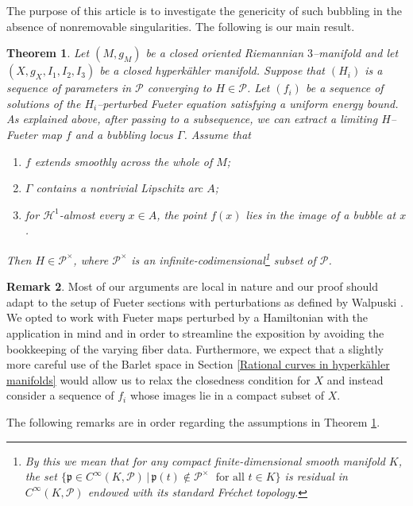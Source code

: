 \documentclass[11pt,a4paper]{article}
\newtheorem{theorem}{Theorem}[section]
\theoremstyle{definition}
\newtheorem{rem}[theorem]{Remark}
\newcommand{\fp}{\mathfrak{p}}
\newcommand{\cH}{\mathcal{H}}
\newcommand{\cP}{\mathcal{P}}
\begin{document}
The purpose of this article is to investigate the genericity of such bubbling in the absence of nonremovable singularities. The following is our main result. 
\begin{theorem}\label{main theorem}
  Let $(M, g_M)$ be a closed oriented Riemannian $3$--manifold and let $(X, g_X, I_1, I_2, I_3)$ be a closed hyperk\"ahler manifold. Suppose that $(H_i)$ is a sequence of parameters in $\cP$ converging to $H \in \cP$. Let $(f_i)$ be a sequence of solutions of the $H_i$--perturbed Fueter equation satisfying a uniform energy bound. As explained above, after passing to a subsequence, we can extract a limiting $H$--Fueter map $f$ and a bubbling locus $\Gamma$. Assume that
  \begin{enumerate}[
  label=\textnormal{(\roman*)},
  topsep=0pt,
  partopsep=0pt
  ]
    \item $f$ extends smoothly across the whole of $M$; 
    \item $\Gamma$ contains a nontrivial Lipschitz arc $A$;
    \item for $\cH^1$-almost every $x \in A$, the point $f(x)$ lies in the image of a bubble at $x$.
  \end{enumerate} 
  Then $H \in \cP^\times$, where $\cP^\times$ is an infinite-codimensional\footnote{By this we mean that for any compact finite-dimensional smooth manifold $K$, the set $\{ \fp \in C^\infty(K, \cP) \, | \, \fp(t) \notin \cP^\times \; \text{ for all } t\in K \}$ is residual in $C^\infty(K, \cP)$ endowed with its standard Fréchet topology.} subset of $\cP$.
\end{theorem}

\begin{rem}
  Most of our arguments are local in nature and our proof should adapt to the setup of Fueter sections with perturbations as defined by Walpuski \cite[pp. 753]{W15}. We opted to work with Fueter maps perturbed by a Hamiltonian with the application \cite{HNS09} in mind and in order to streamline the exposition by avoiding the bookkeeping of the varying fiber data. Furthermore, we expect that a slightly more careful use of the Barlet space in Section \ref{Rational curves in hyperkähler manifolds} would allow us to relax the closedness condition for $X$ and instead consider a sequence of $f_i$ whose images lie in a compact subset of $X$. 
\end{rem}

The following remarks are in order regarding the assumptions in Theorem \ref{main theorem}.
\end{document}
